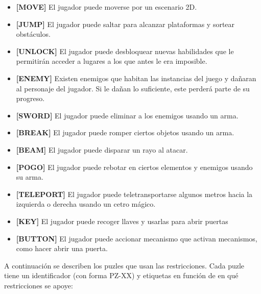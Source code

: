 \begin{itemize}
    \item \textbf{[MOVE]} El jugador puede moverse por un escenario 2D.
    \item \textbf{[JUMP]} El jugador puede saltar para alcanzar plataformas y sortear obstáculos.
    \item \textbf{[UNLOCK]} El jugador puede desbloquear nuevas habilidades que le permitirán acceder a lugares a los que antes le era imposible.
    \item \textbf{[ENEMY]} Existen enemigos que habitan las instancias del juego y dañaran al personaje del jugador. Si le dañan lo suficiente, este perderá parte de su progreso.
    \item \textbf{[SWORD]} El jugador puede eliminar a los enemigos usando un arma.
    \item \textbf{[BREAK]} El jugador puede romper ciertos objetos usando un arma.
    \item \textbf{[BEAM]} El jugador puede disparar un rayo al atacar.
    \item \textbf{[POGO]} El jugador puede rebotar en ciertos elementos y enemigos usando su arma.
    \item \textbf{[TELEPORT]} El jugador puede teletransportarse algunos metros hacia la izquierda o derecha usando un cetro mágico.
    \item \textbf{[KEY]} El jugador puede recoger llaves y usarlas para abrir puertas
    \item \textbf{[BUTTON]} El jugador puede accionar mecanismo que activan mecanismos, como hacer abrir una puerta.
\end{itemize}

A continuación se describen los puzles que usan las restricciones. Cada puzle tiene un identificador (con forma PZ-XX) y etiquetas en función de en qué restricciones se apoye:

